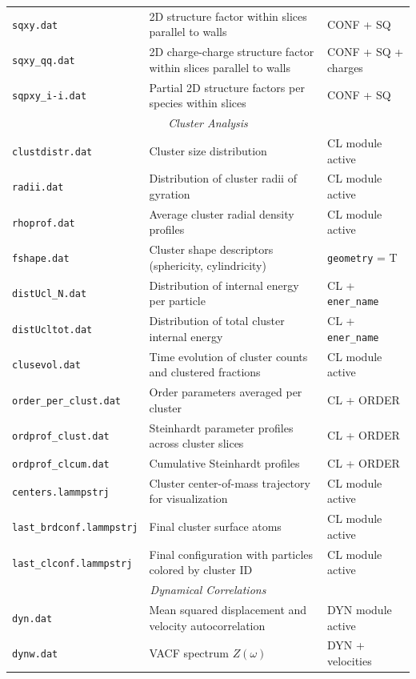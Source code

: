 \documentclass[final,1p,times]{elsarticle}
\begin{document}
\begin{longtable}{p{}p{}p{}}
\texttt{sqxy.dat} & 2D structure factor within slices parallel to walls & CONF + SQ \\
\texttt{sqxy\_qq.dat} & 2D charge-charge structure factor within slices parallel to walls & CONF + SQ + charges \\
\texttt{sqpxy\_i-i.dat} & Partial 2D structure factors per species within slices & CONF + SQ \\
\midrule
\multicolumn{3}{c}{\textit{Cluster Analysis}} \\
\midrule
\texttt{clustdistr.dat} & Cluster size distribution & CL module active \\
\texttt{radii.dat} & Distribution of cluster radii of gyration & CL module active \\
\texttt{rhoprof.dat} & Average cluster radial density profiles & CL module active \\
\texttt{fshape.dat} & Cluster shape descriptors (sphericity, cylindricity) & \texttt{geometry} = T \\
\texttt{distUcl\_N.dat} & Distribution of internal energy per particle & CL + \texttt{ener\_name} \\
\texttt{distUcltot.dat} & Distribution of total cluster internal energy & CL + \texttt{ener\_name} \\
\texttt{clusevol.dat} & Time evolution of cluster counts and clustered fractions & CL module active \\
\texttt{order\_per\_clust.dat}& Order parameters averaged per cluster & CL + ORDER \\
\texttt{ordprof\_clust.dat} & Steinhardt parameter profiles across cluster slices & CL + ORDER \\
\texttt{ordprof\_clcum.dat} & Cumulative Steinhardt profiles & CL + ORDER \\
\texttt{centers.lammpstrj} & Cluster center-of-mass trajectory for visualization & CL module active \\
\texttt{last\_brdconf.lammpstrj} & Final cluster surface atoms & CL module active \\
\texttt{last\_clconf.lammpstrj}& Final configuration with particles colored by cluster ID & CL module active \\
\midrule
\multicolumn{3}{c}{\textit{Dynamical Correlations}} \\
\midrule
\texttt{dyn.dat} & Mean squared displacement and velocity autocorrelation & DYN module active \\
\texttt{dynw.dat} & VACF spectrum $Z(\omega)$ & DYN + velocities \\

\end{longtable}
\end{document}
